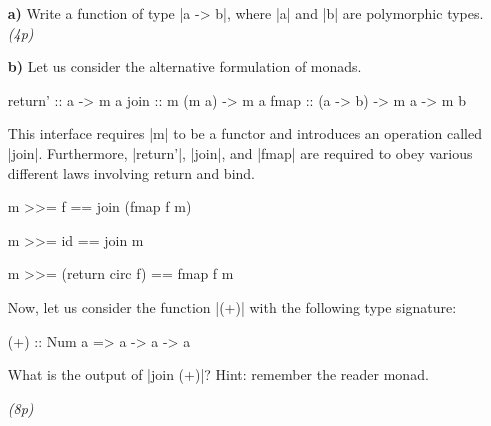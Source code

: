 \documentclass[a4,11pt]{article}
\newif\ifsol
\newcommand{\points}[1]{\hfill \textsl{({#1}p)}}
\begin{document}
\begin{enumerate}


\item[\textbf{a)}] Write a function of type |a -> b|, where |a| and |b| are
  polymorphic types.
\points{4}

\ifsol
\begin{code}
f :: a -> b
f a = undefined
\end{code}

\fi
\item[\textbf{b)}] Let us consider the alternative formulation of monads.

  \begin{code}
  return'  ::  a -> m a
  join     ::  m (m a)   -> m a
  fmap     ::  (a -> b)  -> m a -> m b
  \end{code}

  This interface requires |m| to be a functor and introduces an operation called
  |join|.
%
  Furthermore, |return'|, |join|, and |fmap| are required to obey various
  different laws involving return and bind.

  \begin{code}
  m >>= f                ==   join (fmap f m)

  m >>= id               ==   join m

  m >>= (return circ f)  ==   fmap f m
  \end{code}

  Now, let us consider the function |(+)| with the following type signature:

  \begin{code}
  (+) :: Num a => a -> a -> a
  \end{code}

  What is the output of |join (+)|? Hint: remember the reader monad.

  \ifsol
  We need to make match |a -> a -> a| with |m (m a)|. This implies that
  |m == (a ->)|, which is reader monad.
  By the laws, we know that |join mm == mm >>= id|.
  So,
  \begin{code}
  join (+) == (+) >>= id
  -- The definition of bind for the reader monad is:
  f >>= k = \a -> k (f a) a
  -- Therefore,
  (+) >>= id = \a -> id ((+) a) a
  -- Further reducing
  (+) >>= id = \a -> ((+) a) a
  -- Which is the function double
  \a -> a + a
  \end{code}
  \fi
  \points{8}


\end{enumerate}
\end{document}
